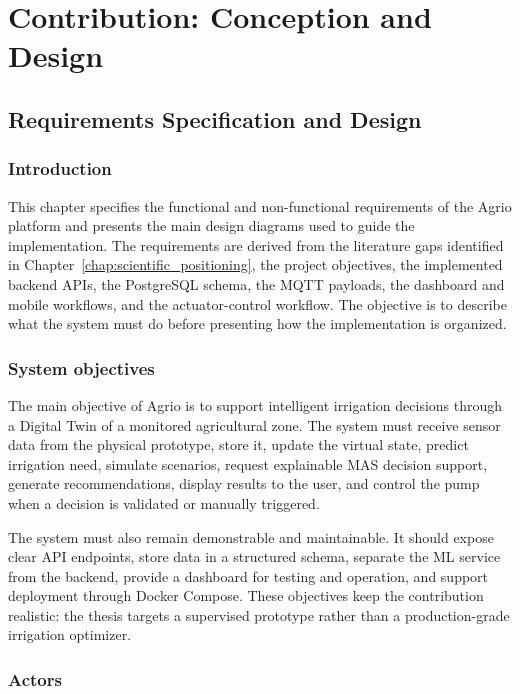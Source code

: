 \part{Contribution: Conception and Design}

\chapter{Requirements Specification and Design}
\label{chap:requirements_design}

\section{Introduction}

This chapter specifies the functional and non-functional requirements of the Agrio platform and presents the main design diagrams used to guide the implementation. The requirements are derived from the literature gaps identified in Chapter~\ref{chap:scientific_positioning}, the project objectives, the implemented backend APIs, the PostgreSQL schema, the MQTT payloads, the dashboard and mobile workflows, and the actuator-control workflow. The objective is to describe what the system must do before presenting how the implementation is organized.

\section{System objectives}

The main objective of Agrio is to support intelligent irrigation decisions through a Digital Twin of a monitored agricultural zone. The system must receive sensor data from the physical prototype, store it, update the virtual state, predict irrigation need, simulate scenarios, request explainable MAS decision support, generate recommendations, display results to the user, and control the pump when a decision is validated or manually triggered.

The system must also remain demonstrable and maintainable. It should expose clear API endpoints, store data in a structured schema, separate the ML service from the backend, provide a dashboard for testing and operation, and support deployment through Docker Compose. These objectives keep the contribution realistic: the thesis targets a supervised prototype rather than a production-grade irrigation optimizer.

\section{Actors}

